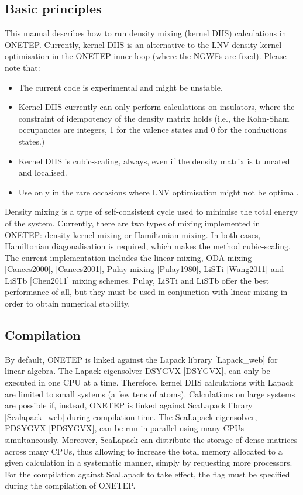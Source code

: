\documentclass[letterpaper,10pt,english]{sphinxmanual}
\begin{document}
\subsection{Basic principles}
\label{\detokenize{onetep_kernel_diis_documentation:basic-principles}}
This manual describes how to run density mixing (kernel DIIS)
calculations in ONETEP. Currently, kernel DIIS is an alternative to the
LNV density kernel optimisation in the ONETEP inner loop (where the
NGWFs are fixed). Please note that:
\begin{itemize}
\item {} 
The current code is experimental and might be unstable.

\item {} 
Kernel DIIS currently can only perform calculations on insulators,
where the constraint of idempotency of the density matrix holds
(i.e., the Kohn-Sham occupancies are integers, 1 for the valence
states and 0 for the conductions states.)

\item {} 
Kernel DIIS is cubic-scaling, always, even if the density matrix is
truncated and localised.

\item {} 
Use only in the rare occasions where LNV optimisation might not be
optimal.

\end{itemize}

Density mixing is a type of self-consistent cycle used to minimise the
total energy of the system. Currently, there are two types of mixing
implemented in ONETEP: density kernel mixing or Hamiltonian mixing. In
both cases, Hamiltonian diagonalisation is required, which makes the
method cubic-scaling. The current implementation includes the linear
mixing, ODA mixing {[}Cances2000{]}, {[}Cances2001{]}, Pulay mixing
{[}Pulay1980{]}, LiSTi {[}Wang2011{]} and LiSTb
{[}Chen2011{]} mixing schemes. Pulay, LiSTi and LiSTb offer
the best performance of all, but they must be used in conjunction with
linear mixing in order to obtain numerical stability.


\subsection{Compilation}
\label{\detokenize{onetep_kernel_diis_documentation:compilation}}
By default, ONETEP is linked against the Lapack library
{[}Lapack\_web{]} for linear algebra. The Lapack
eigensolver DSYGVX {[}DSYGVX{]}, can only be executed in
one CPU at a time. Therefore, kernel DIIS calculations with Lapack are
limited to small systems (a few tens of atoms). Calculations on large
systems are possible if, instead, ONETEP is linked against ScaLapack
library {[}Scalapack\_web{]} during compilation time. The
ScaLapack eigensolver, PDSYGVX {[}PDSYGVX{]}, can be run
in parallel using many CPUs simultaneously. Moreover, ScaLapack can
distribute the storage of dense matrices across many CPUs, thus allowing
to increase the total memory allocated to a given calculation in a
systematic manner, simply by requesting more processors. For the
compilation against ScaLapack to take effect, the flag 
must be specified during the compilation of ONETEP.
\end{document}
